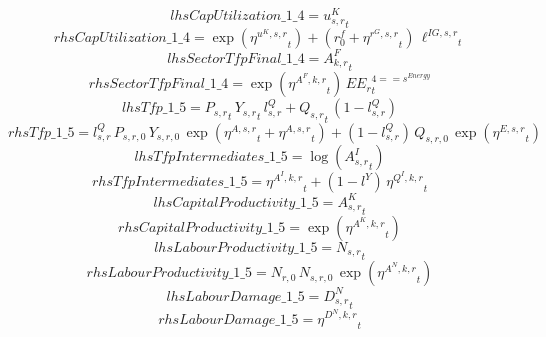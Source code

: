\begin{dmath*}
lhsCapUtilization\_1\_4 = {{u^K_{s,r}}}_{t}
\end{dmath*}
\begin{dmath*}
rhsCapUtilization\_1\_4 = \exp\left({{\eta^{u^K,s,r}}}_{t}\right)+\left({{r^f_0}}+{{\eta^{r^G,s,r}}}_{t}\right)\, {{\ell^{IG,s,r}}}_{t}
\end{dmath*}
\begin{dmath*}
lhsSectorTfpFinal\_1\_4 = {{A^{F}_{k,r}}}_{t}
\end{dmath*}
\begin{dmath*}
rhsSectorTfpFinal\_1\_4 = \exp\left({{\eta^{A^F,k,r}}}_{t}\right)\, {{EE_r}}_{t}^{4=={{s^{Energy}}}}
\end{dmath*}
\begin{dmath*}
lhsTfp\_1\_5 = {{P_{s,r}}}_{t}\, {{Y_{s,r}}}_{t}\, {{l^{Q}_{s,r}}}+{{Q_{s,r}}}_{t}\, \left(1-{{l^{Q}_{s,r}}}\right)
\end{dmath*}
\begin{dmath*}
rhsTfp\_1\_5 = {{l^{Q}_{s,r}}}\, {{P_{s,r,0}}}\, {{Y_{s,r,0}}}\, \exp\left({{\eta^{A,s,r}}}_{t}+{{\eta^{A,s,r}}}_{t}\right)+\left(1-{{l^{Q}_{s,r}}}\right)\, {{Q_{s,r,0}}}\, \exp\left({{\eta^{E,s,r}}}_{t}\right)
\end{dmath*}
\begin{dmath*}
lhsTfpIntermediates\_1\_5 = \log\left({{A^{I}_{s,r}}}_{t}\right)
\end{dmath*}
\begin{dmath*}
rhsTfpIntermediates\_1\_5 = {{\eta^{A^{I},k,r}}}_{t}+\left(1-{{l^{Y}}}\right)\, {{\eta^{Q^{I},k,r}}}_{t}
\end{dmath*}
\begin{dmath*}
lhsCapitalProductivity\_1\_5 = {{A^{K}_{s,r}}}_{t}
\end{dmath*}
\begin{dmath*}
rhsCapitalProductivity\_1\_5 = \exp\left({{\eta^{A^{K},k,r}}}_{t}\right)
\end{dmath*}
\begin{dmath*}
lhsLabourProductivity\_1\_5 = {{N_{s,r}}}_{t}
\end{dmath*}
\begin{dmath*}
rhsLabourProductivity\_1\_5 = {{N_{r,0}}}\, {{N_{s,r,0}}}\, \exp\left({{\eta^{A^{N},k,r}}}_{t}\right)
\end{dmath*}
\begin{dmath*}
lhsLabourDamage\_1\_5 = {{D^N_{s,r}}}_{t}
\end{dmath*}
\begin{dmath*}
rhsLabourDamage\_1\_5 = {{\eta^{D^{N},k,r}}}_{t}
\end{dmath*}
